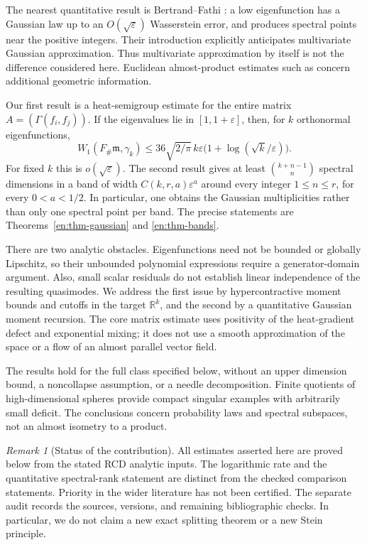 \documentclass[12pt]{amsart}
\theoremstyle{definition}
\theoremstyle{remark}
\newtheorem{rem}[thm]{Remark}
\numberwithin{equation}{section}
\newcommand{\R}{\mathbb{R}}
\newcommand{\m}{\mathfrak m}
\theoremstyle{jpplain}
\begin{document}
The nearest quantitative result is Bertrand--Fathi
\cite[Theorems 1.2 and 1.3]{en:BF}: a low eigenfunction has a Gaussian law up to
an $O(\sqrt\varepsilon)$ Wasserstein error, and produces spectral points near
the positive integers.  Their introduction explicitly anticipates multivariate
Gaussian approximation.  Thus multivariate approximation by itself is not
the difference considered here.  Euclidean almost-product estimates such as
\cite[Theorem 1.2]{en:CF} concern additional geometric information.

Our first result is a heat-semigroup estimate for the entire matrix
$A=(\Gamma(f_i,f_j))$.  If the eigenvalues lie in $[1,1+\varepsilon]$,
then, for $k$ orthonormal eigenfunctions,
\[
 W_1(F_\#\m,\gamma_k)
 \leq36\sqrt{2/\pi}\,k\varepsilon
       \bigl(1+\log(\sqrt{k}/\varepsilon)\bigr).
\]
For fixed $k$ this is $o(\sqrt\varepsilon)$.  The second result gives at least
$\binom{k+n-1}{n}$ spectral dimensions in a band of width
$C(k,r,a)\varepsilon^a$ around every integer $1\leq n\leq r$, for every
$0<a<1/2$.  In particular, one obtains the Gaussian multiplicities rather
than only one spectral point per band.  The precise statements are
Theorems~\ref{en:thm-gaussian} and \ref{en:thm-bands}.

There are two analytic obstacles.  Eigenfunctions need not be bounded or
globally Lipschitz, so their unbounded polynomial expressions require a
generator-domain argument.  Also, small scalar residuals do not establish
linear independence of the resulting quasimodes.  We address the first issue
by hypercontractive moment bounds and cutoffs in the target $\R^k$, and the
second by a quantitative Gaussian moment recursion.  The core matrix estimate
uses positivity of the heat-gradient defect and exponential mixing; it does
not use a smooth approximation of the space or a flow of an almost parallel
vector field.

The results hold for the full class specified below, without an upper
dimension bound, a noncollapse assumption, or a needle decomposition.
Finite quotients of high-dimensional spheres provide compact singular
examples with arbitrarily small deficit.  The conclusions concern probability
laws and spectral subspaces, not an almost isometry to a product.

\begin{rem}[Status of the contribution]
All estimates asserted here are proved below from the stated RCD analytic
inputs.  The logarithmic rate and the quantitative spectral-rank statement
are distinct from the checked comparison statements.  Priority in the wider
literature has not been certified.  The separate audit records the sources,
versions, and remaining bibliographic checks.  In particular, we do not
claim a new exact splitting theorem or a new Stein principle.
\end{rem}
\end{document}
